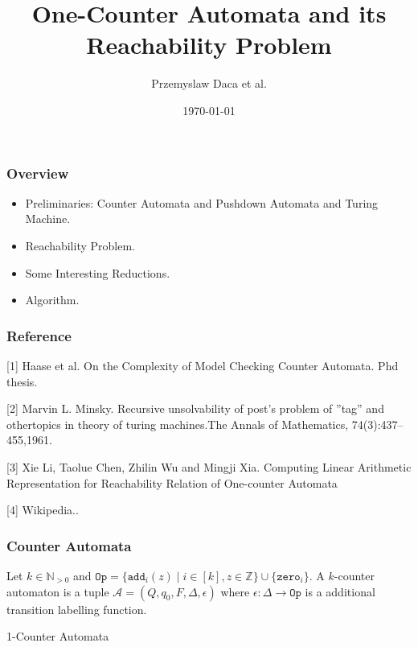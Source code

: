 \documentclass[11pt]{beamer}
\title{One-Counter Automata and its Reachability Problem}
\author{Przemyslaw Daca et al.}
\date{\today}
\begin{document}
\maketitle
\begin{frame}\frametitle{Overview }
\begin{itemize}
\item Preliminaries: Counter Automata and Pushdown Automata and Turing Machine.


\item Reachability Problem.

\item Some Interesting Reductions.


\item Algorithm.

           
\end{itemize}
\end{frame}

\begin{frame}\frametitle{Reference}
[1] Haase et al. On the Complexity of Model Checking Counter Automata. Phd thesis.

[2] Marvin L. Minsky. Recursive unsolvability of post’s problem of ”tag” and othertopics in theory of turing machines.The Annals of Mathematics, 74(3):437–455,1961.

[3] Xie Li, Taolue Chen, Zhilin Wu and Mingji Xia. Computing Linear Arithmetic Representation for Reachability Relation of One-counter Automata

[4] Wikipedia..
\end{frame}

\begin{frame}\frametitle{Counter Automata}
\begin{definition}

Let $k\in \mathbb{N}_{>0}$ and $\texttt{Op} = \{\texttt{add}_i(z)\mid i\in[k], z\in \mathbb{Z}\} \cup \{\texttt{zero}_i\}$. A $k$-counter automaton is a tuple $\mathcal{A} = (Q, q_0, F, \Delta, \epsilon)$ where $\epsilon: \Delta \rightarrow \texttt{Op}$ is a additional transition labelling function.


\end{definition}

\begin{example}{1-Counter Automata}



\end{example}\hspace{5000pt}
\end{frame}
\end{document}
